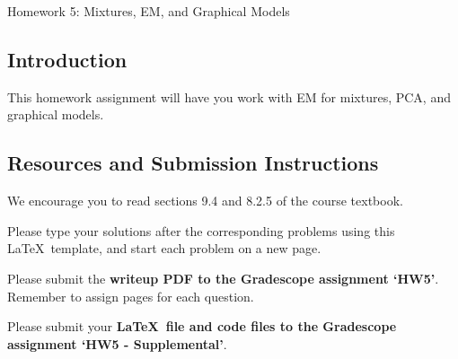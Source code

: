 \documentclass[submit]{harvardml}
\begin{document}
\begin{center}
{\Large Homework 5: Mixtures, EM, and Graphical Models}\\
\end{center}

\subsection*{Introduction}

This homework assignment will have you work with EM for mixtures, PCA,
and graphical models.

\subsection*{Resources and Submission Instructions}

We encourage you to read sections 9.4 and 8.2.5 of the course textbook.

Please type your solutions after the corresponding problems using this
\LaTeX\ template, and start each problem on a new page.

Please submit the \textbf{writeup PDF to the Gradescope assignment `HW5'}. Remember to assign pages for each question.

Please submit your \textbf{\LaTeX\ file and code files to the Gradescope assignment `HW5 - Supplemental'}. 
\end{document}
